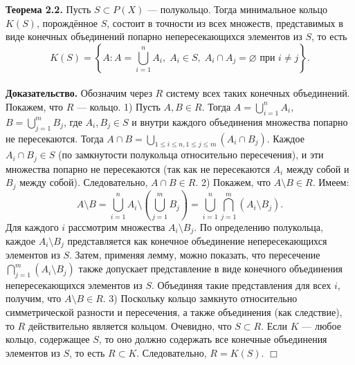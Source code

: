 \documentclass[12pt]{article}
\begin{document}
 
\textbf{Теорема 2.2.} Пусть $S \subset P(X)$ — полукольцо. Тогда минимальное кольцо $K(S)$, порождённое $S$, состоит в точности из всех множеств, представимых в виде конечных объединений попарно непересекающихся элементов из $S$, то есть \[ K(S) = \left\{ A : A = \bigcup_{i=1}^{n} A_i, \; A_i \in S, \; A_i \cap A_j = \varnothing \text{ при } i \ne j \right\}. \] \\\textbf{Доказательство.} Обозначим через $R$ систему всех таких конечных объединений. Покажем, что $R$ — кольцо. 1) Пусть $A, B \in R$. Тогда $A = \bigcup_{i=1}^{n} A_i$, $B = \bigcup_{j=1}^{m} B_j$, где $A_i, B_j \in S$ и внутри каждого объединения множества попарно не пересекаются. Тогда $A \cap B = \bigcup_{1 \le i \le n, 1 \le j \le m} (A_i \cap B_j)$. Каждое $A_i \cap B_j \in S$ (по замкнутости полукольца относительно пересечения), и эти множества попарно не пересекаются (так как не пересекаются $A_i$ между собой и $B_j$ между собой). Следовательно, $A \cap B \in R$. 2) Покажем, что $A \setminus B \in R$. Имеем: \[ A \setminus B = \bigcup_{i=1}^{n} A_i \setminus \left( \bigcup_{j=1}^{m} B_j \right) = \bigcup_{i=1}^{n} \bigcap_{j=1}^{m} (A_i \setminus B_j). \] Для каждого $i$ рассмотрим множества $A_i \setminus B_j$. По определению полукольца, каждое $A_i \setminus B_j$ представляется как конечное объединение непересекающихся элементов из $S$. Затем, применяя лемму, можно показать, что пересечение $\bigcap_{j=1}^{m} (A_i \setminus B_j)$ также допускает представление в виде конечного объединения непересекающихся элементов из $S$. Объединяя такие представления для всех $i$, получим, что $A \setminus B \in R$. 3) Поскольку кольцо замкнуто относительно симметрической разности и пересечения, а также объединения (как следствие), то $R$ действительно является кольцом. Очевидно, что $S \subset R$. Если $K$ — любое кольцо, содержащее $S$, то оно должно содержать все конечные объединения элементов из $S$, то есть $R \subset K$. Следовательно, $R = K(S)$. \hfill $\Box$


\end{document}
